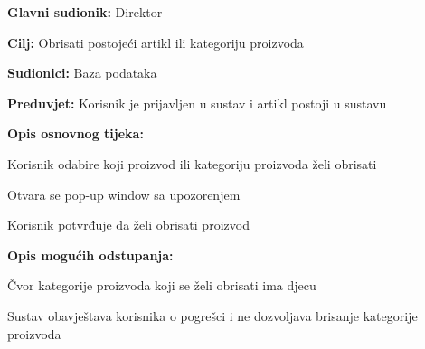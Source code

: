 					\noindent {}
					\begin{packed_item}
						\item \textbf{Glavni sudionik: }Direktor
						\item  \textbf{Cilj:} Obrisati postojeći artikl ili kategoriju proizvoda 
						\item  \textbf{Sudionici:} Baza podataka
						\item  \textbf{Preduvjet:} Korisnik je prijavljen u sustav i artikl postoji u sustavu
						\item  \textbf{Opis osnovnog tijeka:}
						
						\item[] \begin{packed_enum}
							\item Korisnik odabire koji proizvod ili kategoriju proizvoda želi obrisati
							\item Otvara se pop-up window sa upozorenjem
							\item Korisnik potvrđuje da želi obrisati proizvod
						\end{packed_enum}
					\item  \textbf{Opis mogućih odstupanja:} 
					\item[] \begin{packed_item}
						
						\item[2.a] Čvor kategorije proizvoda koji se želi obrisati ima djecu
						\item[] \begin{packed_enum}
							
							\item Sustav obavještava korisnika o pogrešci i ne dozvoljava brisanje kategorije proizvoda
							
						\end{packed_enum}
					\end{packed_item}
					
					\end{packed_item}
				
